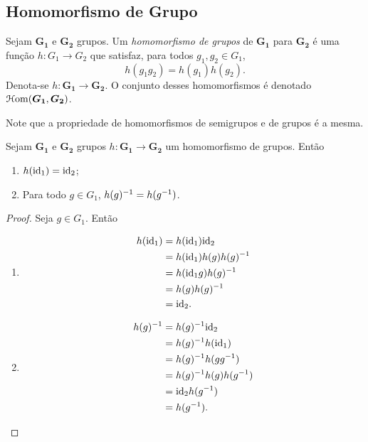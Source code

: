 \subsection{Homomorfismo de Grupo}

\begin{defi}
Sejam $\bm{G_1}$ e $\bm{G_2}$ grupos. Um \emph{homomorfismo de grupos} de $\bm{G_1}$ para $\bm{G_2}$ é uma função $h: G_1 \to G_2$ que satisfaz, para todos $g_1,g_2 \in G_1$,
	\begin{equation*}
	h(g_1g_2)=h(g_1)h(g_2).
	\end{equation*}
Denota-se $h: \bm{G_1} \to \bm{G_2}$. O conjunto desses homomorfismos é denotado $\mathcal{H}\mathrm{om}(\bm{G_1},\bm{G_2})$.
\end{defi}

Note que a propriedade de homomorfismos de semigrupos e de grupos é a mesma.

\begin{prop}
\label{prop.hom.gru}
Sejam $\bm{G_1}$ e $\bm{G_2}$ grupos $h: \bm{G_1} \to \bm{G_2}$ um homomorfismo de grupos. Então
	\begin{enumerate}
	\item $h(\mathrm{id}_1)=\mathrm{id}_2$;
	\item Para todo $g \in G_1$, $h(g)^{-1}=h(g^{-1})$.
	\end{enumerate}
\end{prop}
\begin{proof}
Seja $g \in G_1$. Então
	\begin{enumerate}
	\item
		\begin{align*}
		h(\mathrm{id}_1) &= h(\mathrm{id}_1) \mathrm{id}_2 \\
			&= h(\mathrm{id}_1) h(g) h(g)^{-1} \\
			&= h(\mathrm{id}_1 g) h(g)^{-1} \\
			&= h(g) h(g)^{-1} \\
			&= \mathrm{id}_2.
		\end{align*}
	\item
		\begin{align*}
		h(g)^{-1} &= h(g)^{-1} \mathrm{id}_2 \\
			&= h(g)^{-1} h(\mathrm{id}_1) \\
			&= h(g)^{-1} h(g g^{-1}) \\
			&= h(g)^{-1} h(g) h(g^{-1}) \\
			&= \mathrm{id}_2 h(g^{-1}) \\
			&= h(g^{-1}). \qedhere
		\end{align*}
	\end{enumerate}
\end{proof}

